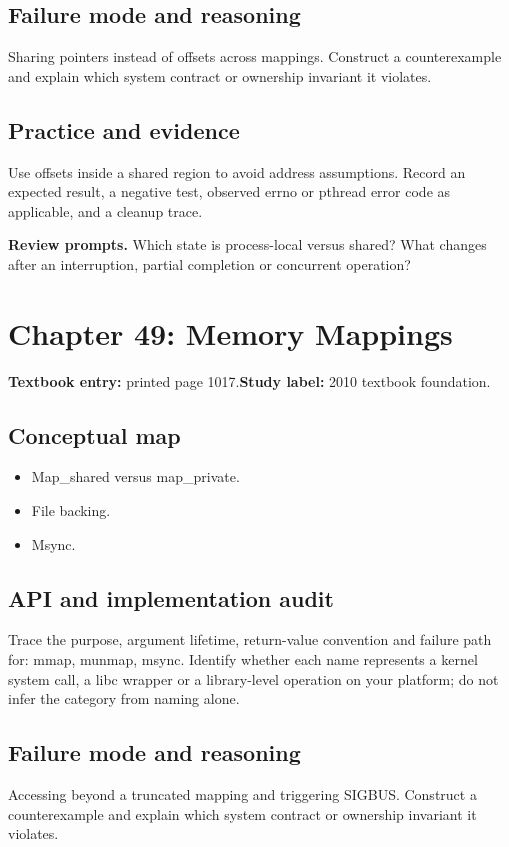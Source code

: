 \documentclass[11pt,letterpaper,oneside]{report}
\begin{document}
\subsection{Failure mode and reasoning}
Sharing pointers instead of offsets across mappings. Construct a counterexample and explain which system contract or ownership invariant it violates.

\subsection{Practice and evidence}
Use offsets inside a shared region to avoid address assumptions. Record an expected result, a negative test, observed errno or pthread error code as applicable, and a cleanup trace.

\textbf{Review prompts.} Which state is process-local versus shared? What changes after an interruption, partial completion or concurrent operation?

\section{Chapter 49: Memory Mappings}
\textbf{Textbook entry:} printed page 1017.\quad \textbf{Study label:} 2010 textbook foundation.

\subsection{Conceptual map}
\begin{itemize}
\item Map\_shared versus map\_private.
\item File backing.
\item Msync.
\end{itemize}
\subsection{API and implementation audit}
Trace the purpose, argument lifetime, return-value convention and failure path for: mmap, munmap, msync. Identify whether each name represents a kernel system call, a libc wrapper or a library-level operation on your platform; do not infer the category from naming alone.

\subsection{Failure mode and reasoning}
Accessing beyond a truncated mapping and triggering SIGBUS. Construct a counterexample and explain which system contract or ownership invariant it violates.
\end{document}
